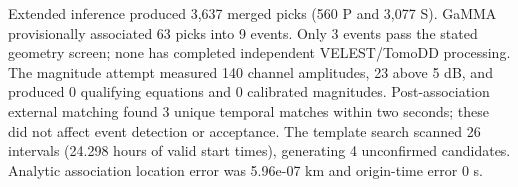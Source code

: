 Extended inference produced 3,637 merged picks (560 P and 3,077 S). GaMMA provisionally associated 63 picks into 9 events. Only 3 events pass the stated geometry screen; none has completed independent VELEST/TomoDD processing. The magnitude attempt measured 140 channel amplitudes, 23 above 5 dB, and produced 0 qualifying equations and 0 calibrated magnitudes. Post-association external matching found 3 unique temporal matches within two seconds; these did not affect event detection or acceptance. The template search scanned 26 intervals (24.298 hours of valid start times), generating 4 unconfirmed candidates. Analytic association location error was 5.96e-07 km and origin-time error 0 s.
